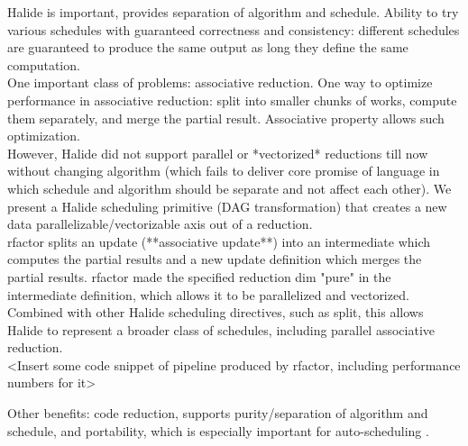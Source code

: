Halide \cite{Ragan-Kelley:2013:HLC:2491956.2462176} is important, provides separation of algorithm and schedule. Ability to try various schedules with guaranteed correctness and consistency: different schedules are guaranteed to produce the same output as long they define the same computation. \\

One important class of problems: associative reduction. One way to optimize performance in associative reduction: split into smaller chunks of works, compute them separately, and merge the partial result. Associative property allows such optimization. \\

However, Halide did not support parallel or *vectorized* reductions till now without changing algorithm (which fails to deliver core promise of language in which schedule and algorithm should be separate and not affect each other). We present a Halide scheduling primitive (DAG transformation) that creates a new data parallelizable/vectorizable axis out of a reduction. \\

rfactor splits an update (**associative update**) into an intermediate which computes the partial results and a new update definition which merges the partial results. rfactor made the specified reduction dim "pure" in the intermediate definition, which allows it to be parallelized and vectorized. Combined with other Halide scheduling directives, such as split, this allows Halide to represent a broader class of schedules, including parallel associative reduction. \\

<Insert some code snippet of pipeline produced by rfactor, including performance numbers for it>

Other benefits: code reduction, supports purity/separation of algorithm and schedule, and portability, which is especially important for auto-scheduling \cite{Mullapudi:2016:ASH:2897824.2925952}. \\
